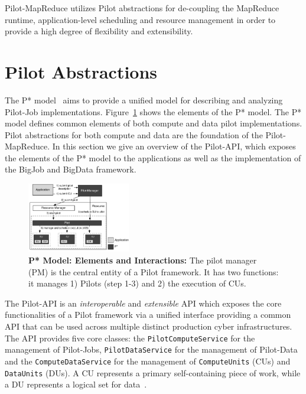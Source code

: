 \documentclass{acm_proc_article-sp}
\newcommand{\jhanote}[1]{ {\textcolor{red} { ***SJ: #1 }}}
\newcommand{\alnote}[1]{ {\textcolor{blue} { ***andreL: #1 }}}
\newcommand{\alnote}[1]{}
\newcommand{\jhanote}[1]{}
\newcommand{\upp}{\vspace*{-0.5em}}
\newcommand{\pilot}{Pilot\xspace}
\newcommand{\pilotjob}{Pilot-Job\xspace}
\newcommand{\pilotmapreduce}{Pilot-MapReduce\xspace}
\newcommand{\cus}{CUs\xspace}
\begin{document}
\pilotmapreduce utilizes \pilot abstractions for de-coupling the
MapReduce runtime, application-level scheduling and resource
management in order to provide a high degree of flexibility and
extensibility.






\upp
\section{Pilot Abstractions}
\label{sec-pilot-impl}


The P* model~\cite{pstar-2012} aims to provide a unified model for describing
and analyzing \pilotjob implementations. Figure~\ref{fig:figures_pstar} shows
the elements of the P* model. The P* model defines common elements of both
compute and data pilot implementations. Pilot abstractions for both compute and
data are the foundation of the \pilotmapreduce. In this section we give an
overview of the Pilot-API, which exposes the elements of the P* model to the
applications as well as the implementation of the BigJob and BigData framework.


\begin{figure}[t]
	\upp\upp
    \centering
    \includegraphics[width=0.4\textwidth]{figures/pstar_model_single.pdf}
    \caption{ \textbf{P* Model: Elements and
        Interactions:} The pilot manager (PM) is the central entity of a \pilot 
     framework. It has two functions: it manages 1) Pilots (step 1-3) and 2) the 
     execution of \cus.}
	\upp\upp
    \label{fig:figures_pstar}
\end{figure}


The Pilot-API is an {\it interoperable} and {\it extensible} API which
exposes the core functionalities of a \pilot framework via a unified
interface providing a common API that can be used across multiple
distinct production cyber infrastructures.  The API provides five
core classes: the \texttt{PilotComputeService} for the management of
Pilot-Jobs, \texttt{PilotDataService} for the management of Pilot-Data
and the \texttt{ComputeDataService} for the management of
\texttt{ComputeUnits} (CUs) and \texttt{DataUnits} (DUs). 
A CU represents a primary self-containing piece of work, while a DU
represents a logical set for data~\cite{pstar-2012}.
\end{document}
